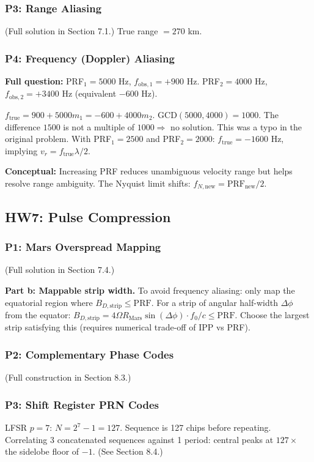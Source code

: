 \documentclass[10pt,letterpaper]{article}
\begin{document}
\subsubsection{P3: Range Aliasing}
(Full solution in Section 7.1.) True range $= 270$ km.

\subsubsection{P4: Frequency (Doppler) Aliasing}
\textbf{Full question:} PRF$_1 = 5000$ Hz, $f_\mathrm{obs,1} = +900$ Hz. PRF$_2 = 4000$ Hz, $f_\mathrm{obs,2} = +3400$ Hz (equivalent $-600$ Hz).

$f_\mathrm{true} = 900 + 5000m_1 = -600 + 4000m_2$. GCD$(5000,4000)=1000$. The difference $1500$ is not a multiple of $1000 \Rightarrow$ no solution. This was a typo in the original problem. With PRF$_1=2500$ and PRF$_2=2000$: $f_\mathrm{true} = -1600$ Hz, implying $v_r = f_\mathrm{true}\lambda/2$.

\textbf{Conceptual:} Increasing PRF reduces unambiguous velocity range but helps resolve range ambiguity. The Nyquist limit shifts: $f_{N,\mathrm{new}} = \mathrm{PRF}_\mathrm{new}/2$.

\subsection{HW7: Pulse Compression}

\subsubsection{P1: Mars Overspread Mapping}
(Full solution in Section 7.4.)

\textbf{Part b: Mappable strip width.}
To avoid frequency aliasing: only map the equatorial region where $B_{D,\mathrm{strip}} \leq \mathrm{PRF}$.
For a strip of angular half-width $\Delta\phi$ from the equator:
$B_{D,\mathrm{strip}} = 4\Omega R_\mathrm{Mars}\sin(\Delta\phi)\cdot f_0/c \leq \mathrm{PRF}$.
Choose the largest strip satisfying this (requires numerical trade-off of IPP vs PRF).

\subsubsection{P2: Complementary Phase Codes}
(Full construction in Section 8.3.)

\subsubsection{P3: Shift Register PRN Codes}
LFSR $p=7$: $N = 2^7 - 1 = 127$. Sequence is 127 chips before repeating. Correlating 3 concatenated sequences against 1 period: central peaks at $127\times$ the sidelobe floor of $-1$. (See Section 8.4.)
\end{document}
